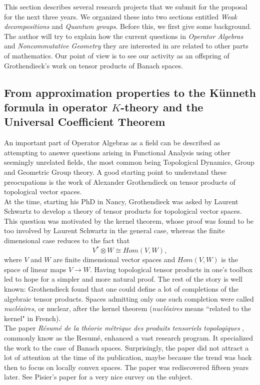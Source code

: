 This section describes several research projects that we submit for the proposal for the next three years. We organized these into two sections entitled \textit{Weak decompositions} and \textit{Quantum groups}. Before this, we first give some background. The author will try to explain how the current questions in \textit{Operator Algebras} and \textit{Noncommutative Geometry} they are interested in are related to other parts of mathematics. Our point of view is to see our activity as an offspring of Grothendieck's work on tensor products of Banach spaces.    

\subsection{From approximation properties to the K\"unneth formula in operator $K$-theory and the Universal Coefficient Theorem}

An important part of Operator Algebras as a field can be described as attempting to answer questions arising in Functional Analysis using other seemingly unrelated fields, the most common being Topological Dynamics, Group and Geometric Group theory. A good starting point to understand these preocupations is the work of Alexander Grothendieck on tensor products of topological vector spaces. \\

At the time, starting his PhD in Nancy, Grothendieck was asked by Laurent Schwartz to develop a theory of tensor products for topological vector spaces. This question was motivated by the kernel theorem, whose proof was found to be too involved by Laurent Schwartz in the general case, whereas the finite dimensional case reduces to the fact that 
\[V^*\otimes W \cong Hom(V,W),\] 
where $V$ and $W$ are finite dimensional vector spaces and $Hom(V,W)$ is the space of linear maps $V\rightarrow W$. Having topological tensor products in one's toolbox led to hope for a simpler and more natural proof. The rest of the story is well known: Grothendieck found that one could define a lot of completions of the algebraic tensor products. Spaces admitting only one such completion were called \textit{nucl\'eaires}, or nuclear, after the kernel theorem (\textit{nucl\'eaires} means ``related to the kernel" in French).\\

The paper \textit{R\'esum\'e de la th\'eorie m\'etrique des produits tensoriels topologiques} \cite{GrothendieckResume}, commonly know as the Resum\'e, enhanced a vast research program. It specialized the work to the case of Banach spaces. Surprisingly, the paper did not attract a lot of attention at the time of its publication, maybe because the trend was back then to focus on locally convex spaces. The paper was rediscovered fifteen years later. See Pisier's paper \cite{PisierSurvey} for a very nice survey on the subject.\\

